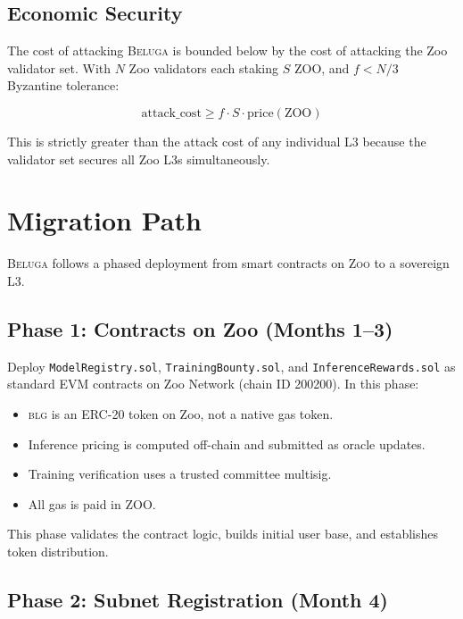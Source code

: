 \documentclass[11pt,letterpaper]{article}
\newcommand{\Zoo}{\textsc{Zoo}}
\newcommand{\Beluga}{\textsc{Beluga}}
\newcommand{\BLG}{\textsc{blg}}
\begin{document}
\subsection{Economic Security}

The cost of attacking \Beluga{} is bounded below by the cost of attacking the Zoo validator set. With $N$ Zoo validators each staking $S$ ZOO, and $f < N/3$ Byzantine tolerance:

\begin{equation}
\text{attack\_cost} \geq f \cdot S \cdot \text{price}(\text{ZOO})
\end{equation}

This is strictly greater than the attack cost of any individual L3 because the validator set secures all Zoo L3s simultaneously.

\section{Migration Path}\label{sec:migration}

\Beluga{} follows a phased deployment from smart contracts on \Zoo{} to a sovereign L3.

\subsection{Phase 1: Contracts on Zoo (Months 1--3)}

Deploy \texttt{ModelRegistry.sol}, \texttt{TrainingBounty.sol}, and \texttt{InferenceRewards.sol} as standard EVM contracts on Zoo Network (chain ID 200200). In this phase:

\begin{itemize}[nosep]
    \item \BLG{} is an ERC-20 token on Zoo, not a native gas token.
    \item Inference pricing is computed off-chain and submitted as oracle updates.
    \item Training verification uses a trusted committee multisig.
    \item All gas is paid in ZOO.
\end{itemize}

This phase validates the contract logic, builds initial user base, and establishes token distribution.

\subsection{Phase 2: Subnet Registration (Month 4)}
\end{document}
